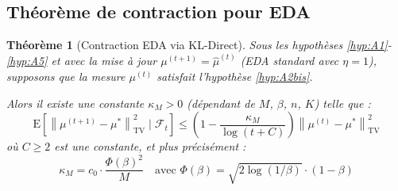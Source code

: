 \documentclass[12pt,a4paper]{article}
\newtheorem{theorem}{Théorème}[section]
\theoremstyle{definition}
\theoremstyle{remark}
\newcommand{\E}{\text{E}}
\newcommand{\TV}{\text{TV}}
\newcommand{\norm}[1]{\left\|#1\right\|}
\begin{document}
	\subsection{Théorème de contraction pour EDA}
	
	\begin{theorem}[Contraction EDA via KL-Direct]\label{thm:contraction}
		Sous les hypothèses \ref{hyp:A1}-\ref{hyp:A5} et avec la mise à jour $\mu^{(t+1)} = \hat{\mu}^{(t)}$ (EDA standard avec $\eta = 1$), supposons que la mesure $\mu^{(t)}$ satisfait l'hypothèse \ref{hyp:A2bis}.
		
		Alors il existe une constante $\kappa_M > 0$ (dépendant de $M$, $\beta$, $n$, $K$) telle que :
		\begin{equation}
			\E\left[\norm{\mu^{(t+1)} - \mu^*}_{\TV}^2 \mid \mathcal{F}_t\right] \leq \left(1 - \frac{\kappa_M}{\log(t+C)}\right) \norm{\mu^{(t)} - \mu^*}_{\TV}^2
		\end{equation}
		où $C \geq 2$ est une constante, et plus précisément :
		\begin{equation}
			\kappa_M = c_0 \cdot \frac{\Phi(\beta)^2}{M} \quad \text{avec } \Phi(\beta) = \sqrt{2\log(1/\beta)} \cdot (1-\beta)
		\end{equation}
	\end{theorem}
	
\end{document}
